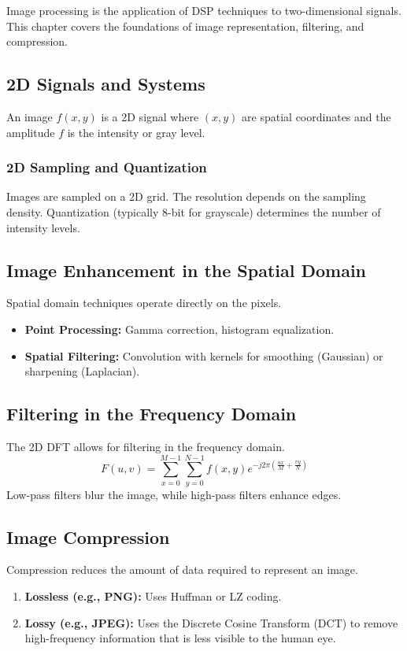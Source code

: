 
Image processing is the application of DSP techniques to two-dimensional signals. This chapter covers the foundations of image representation, filtering, and compression.

\subsection{2D Signals and Systems}
An image $f(x, y)$ is a 2D signal where $(x, y)$ are spatial coordinates and the amplitude $f$ is the intensity or gray level.

\subsubsection{2D Sampling and Quantization}
Images are sampled on a 2D grid. The resolution depends on the sampling density. Quantization (typically 8-bit for grayscale) determines the number of intensity levels.

\subsection{Image Enhancement in the Spatial Domain}
Spatial domain techniques operate directly on the pixels.
\begin{itemize}
    \item \textbf{Point Processing:} Gamma correction, histogram equalization.
    \item \textbf{Spatial Filtering:} Convolution with kernels for smoothing (Gaussian) or sharpening (Laplacian).
\end{itemize}

\subsection{Filtering in the Frequency Domain}
The 2D DFT allows for filtering in the frequency domain.
\begin{equation}
    F(u, v) = \sum_{x=0}^{M-1} \sum_{y=0}^{N-1} f(x, y) e^{-j2\pi(\frac{ux}{M} + \frac{vy}{N})}
\end{equation}
Low-pass filters blur the image, while high-pass filters enhance edges.

\subsection{Image Compression}
Compression reduces the amount of data required to represent an image.
\begin{enumerate}
    \item \textbf{Lossless (e.g., PNG):} Uses Huffman or LZ coding.
    \item \textbf{Lossy (e.g., JPEG):} Uses the Discrete Cosine Transform (DCT) to remove high-frequency information that is less visible to the human eye.
\end{enumerate}

